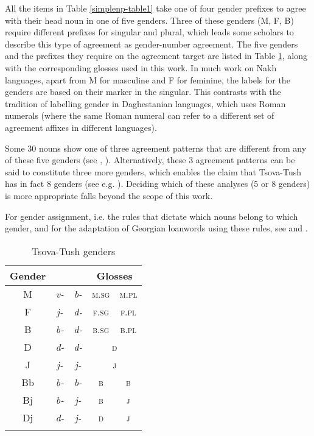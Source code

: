 All the items in Table \ref{simplenp-table1} take one of four gender prefixes to agree with their head noun in one of five genders. Three of these genders (M, F, B) require different prefixes for singular and plural, which leads some scholars to describe this type of agreement as gender-number agreement. The five genders and the prefixes they require on the agreement target are listed in Table \ref{simplenp-table2}, along with the corresponding glosses used in this work. In much work on Nakh languages, apart from M for masculine and F for feminine, the labels for the genders are based on their marker in the singular. This contrasts with the tradition of labelling gender in Daghestanian languages, which uses Roman numerals (where the same Roman numeral can refer to a different set of agreement affixes in different languages).

 Some 30 nouns show one of three agreement patterns that are different from any of these five genders (see \cite[163]{holiskygagua}, \cite[170--172]{corbett91}). Alternatively, these 3 agreement patterns can be said to constitute three more genders, which enables the claim that Tsova-Tush has in fact 8 genders (see e.g. \cite{chrelashvili67,haukharris}). Deciding which of these analyses (5 or 8 genders) is more appropriate falls beyond the scope of this work.


For gender assignment, i.e. the rules that dictate which nouns belong to which gender, and for the adaptation of Georgian loanwords using these rules, see \textcite{WS} and . 

\begin{table}
	\begin{tabular}{ccccc}
    \lsptoprule
		Gender & {{\Sg}} & {{\Pl}} & \multicolumn{2}{c}{{Glosses}}  \\
		\midrule
		
		M & \textit{v-} & \textit{b-} & \textsc{m.sg} & \textsc{m.pl} \\
		F & \textit{j-} & \textit{d-} & \textsc{f.sg} & \textsc{f.pl}\\
		B & \textit{b-} & \textit{d-} & \textsc{b.sg} & \textsc{b.pl}\\
		D & \textit{d-} & \textit{d-} & \multicolumn{2}{c}{\textsc{d}} \\
		J & \textit{j-} & \textit{j-} & \multicolumn{2}{c}{\textsc{j}} \\
		
		\midrule
		Bb & \textit{b-} & \textit{b-} & \textsc{b} & \textsc{b} \\
		
		Bj & \textit{b-} & \textit{j-} & \textsc{b} & \textsc{j} \\
		
		Dj & \textit{d-} & \textit{j-} & \textsc{d} & \textsc{j} \\
		\lspbottomrule
		
	\end{tabular}
	\caption{Tsova-Tush genders}
	\label{simplenp-table2}
\end{table}

